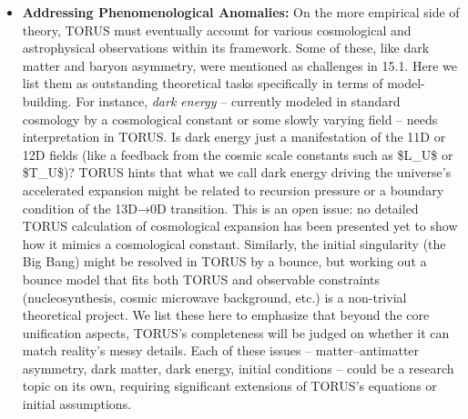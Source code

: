 \documentclass[
]{article}
\begin{document}
{\begin{itemize}
  \$\textbackslash Lambda\_\{\textbackslash text\{rec\}\}\$ (the
  recursion-corrected cosmological term) by analogy, but a thorough
  derivation from first principles is still pending. Likewise, we have
  to ensure that the field equations with recursion terms do not violate
  any known mathematical consistency conditions (for instance, Bianchi
  identities in general relativity or gauge invariances in field
  theory). Ensuring consistency might reveal new conditions that further
  restrict the form of recursion coupling. All these issues point to a
  clear priority: \textbf{mathematical refinement} is not just a
  formality, but a way to discover possible flaws or additional
  predictions of TORUS. It's an area that theoretical physicists and
  mathematicians can delve into even in advance of new experimental
  data, and it complements the conceptual issues listed above.
\item
  \textbf{Addressing Phenomenological Anomalies:} On the more empirical
  side of theory, TORUS must eventually account for various cosmological
  and astrophysical observations within its framework. Some of these,
  like dark matter and baryon asymmetry, were mentioned as challenges in
  15.1. Here we list them as outstanding theoretical tasks specifically
  in terms of model-building. For instance, \emph{dark energy} --
  currently modeled in standard cosmology by a cosmological constant or
  some slowly varying field -- needs interpretation in TORUS. Is dark
  energy just a manifestation of the 11D or 12D fields (like a feedback
  from the cosmic scale constants such as \$L\_U\$ or \$T\_U\$)? TORUS
  hints that what we call dark energy driving the universe's accelerated
  expansion might be related to recursion pressure or a boundary
  condition of the 13D→0D transition. This is an open issue: no detailed
  TORUS calculation of cosmological expansion has been presented yet to
  show how it mimics a cosmological constant. Similarly, the initial
  singularity (the Big Bang) might be resolved in TORUS by a bounce, but
  working out a bounce model that fits both TORUS and observable
  constraints (nucleosynthesis, cosmic microwave background, etc.) is a
  non-trivial theoretical project. We list these here to emphasize that
  beyond the core unification aspects, TORUS's completeness will be
  judged on whether it can match reality's messy details. Each of these
  issues -- matter--antimatter asymmetry, dark matter, dark energy,
  initial conditions -- could be a research topic on its own, requiring
  significant extensions of TORUS's equations or initial assumptions.

\end{itemize}}
\end{document}
